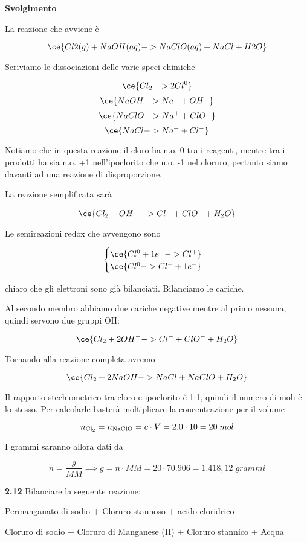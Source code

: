\vspace{0.2cm}\large\textbf{Svolgimento}\normalsize

\vspace{0.2cm}La reazione che avviene è

$$\ce{Cl2(g) + NaOH(aq) ->  NaClO(aq) + NaCl + H2O}$$

Scriviamo le dissociazioni delle varie speci chimiche

$$\ce{Cl_2 -> 2Cl^0 }$$
$$\ce{NaOH -> Na^+ + OH^-}$$
$$\ce{NaClO -> Na^+ + ClO^-}$$
$$\ce{NaCl -> Na^+ + Cl^-}$$

Notiamo che in questa reazione il cloro ha n.o. 0 tra i reagenti, mentre tra i prodotti ha sia n.o. +1 nell'ipoclorito che n.o. -1 nel cloruro, pertanto siamo davanti ad una reazione di disproporzione.

La reazione semplificata sarà

$$\ce{Cl_2 + OH^- -> Cl^- + ClO^- + H_2O}$$

Le semireazioni redox che avvengono sono

$$\begin{cases}
    \ce{Cl^{0} + 1e^- -> Cl^+}\\
    \ce{Cl^{0} -> Cl^+ + 1e^-}
\end{cases}$$

\E chiaro che gli elettroni sono già bilanciati. Bilanciamo le cariche.

Al secondo membro abbiamo due cariche negative mentre al primo nessuna, quindi servono due gruppi OH:

$$\ce{Cl_2 + 2OH^- -> Cl^- + ClO^- + H_2O}$$

Tornando alla reazione completa avremo

$$\ce{Cl_2 + 2NaOH -> NaCl + NaClO + H_2O}$$

Il rapporto stechiometrico tra cloro e ipoclorito è 1:1, quindi il numero di moli è lo stesso. Per calcolarle basterà moltiplicare la concentrazione per il volume

$$n_{\rm Cl_2}=n_{\rm NaClO}=c \cdot V=2.0 \cdot 10=20\;mol$$

I grammi saranno allora dati da

$$n=\frac{g}{MM} \implies g=n \cdot MM=20 \cdot 70.906=1.418,12\;grammi$$

\vspace{0.2cm}\textbf{2.12} Bilanciare la seguente reazione:

\begin{center}
    Permanganato di sodio + Cloruro stannoso + acido cloridrico \ce{->}

    \ce{->} Cloruro di sodio + Cloruro di Manganese (II) + Cloruro stannico + Acqua
\end{center}


